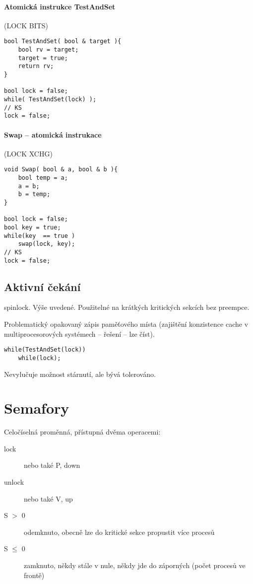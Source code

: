 \documentclass[a4paper, 11pt]{report}
\begin{document}
\paragraph{Atomická instrukce TestAndSet} (LOCK BITS)

\begin{lstlisting}
bool TestAndSet( bool & target ){
	bool rv = target;
	target = true;
	return rv;
}

bool lock = false;
while( TestAndSet(lock) );
// KS
lock = false;
\end{lstlisting}

\paragraph{Swap -- atomická instrukace} (LOCK XCHG)

\begin{lstlisting}
void Swap( bool & a, bool & b ){
	bool temp = a;
	a = b;
	b = temp;
}

bool lock = false;
bool key = true;
while(key  == true )
	swap(lock, key);
// KS
lock = false;
\end{lstlisting}

\subsection{Aktivní čekání}
spinlock. Výše uvedené. Použitelné na krátkých kritických sekcích bez preempce.

Problematický opakovaný zápis paměťového místa (zajištění konzistence cache v multiprocesorových systémech -- řešení -- lze číst).

\begin{lstlisting}
while(TestAndSet(lock))
	while(lock);
\end{lstlisting}
Nevylučuje možnost stárnutí, ale bývá tolerováno.

\section{Semafory}

Celočíselná proměnná, přístupná dvěma operacemi:
\begin{description}
	\item[lock] nebo také P, down
	\item[unlock] nebo také V, up
\end{description}

\begin{description}
	\item[S $>$ 0] odemknuto, obecně lze do kritické sekce propustit více procesů
	\item[S $\leq$ 0] zamknuto, někdy stále v nule, někdy jde do záporných (počet procesů ve frontě)
\end{description}
\end{document}
